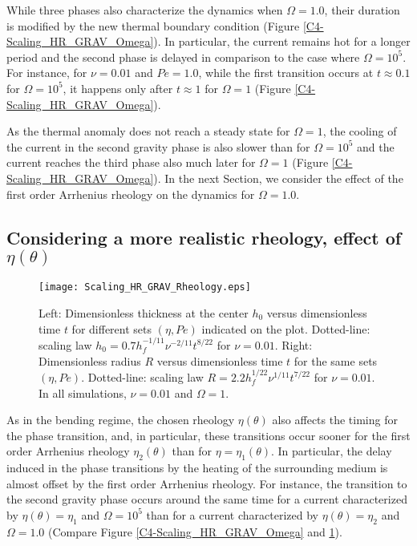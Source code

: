 While three  phases also characterize the  dynamics when $\Omega=1.0$,
their  duration is  modified  by the  new  thermal boundary  condition
(Figure \ref{C4-Scaling_HR_GRAV_Omega}).   In particular,  the current
remains hot  for a longer  period and the  second phase is  delayed in
comparison  to  the case  where  $\Omega  =10^5$.  For  instance,  for
$\nu=0.01$  and  $Pe=1.0$,  while   the  first  transition  occurs  at
$t \approx 0.1$ for $\Omega=10^5$,  it happens only after $t\approx 1$
for $\Omega=1$ (Figure \ref{C4-Scaling_HR_GRAV_Omega}).

As the thermal  anomaly does not reach a steady  state for $\Omega=1$,
the cooling of the current in  the second gravity phase is also slower
than for  $\Omega=10^5$ and the  current reaches the third  phase also
much later for $\Omega=1$ (Figure \ref{C4-Scaling_HR_GRAV_Omega}).  In
the next Section,  we consider the effect of the  first order Arrhenius
rheology on the dynamics for $\Omega=1.0$.

\subsection{Considering   a  more   realistic   rheology,  effect   of
  $\eta(\theta)$}
\label{C4-sec:cons-more-real-1}
 
\begin{figure}[h!]
  \begin{center}
    \graphicspath{ {/Users/thorey/Documents/These/Projet/Refroidissement/Skin_Model/Figure/Figure_Heating/} }
    \texttt{[image: Scaling\_HR\_GRAV\_Rheology.eps]}
    \caption{Left: Dimensionless thickness at  the center $h_0$ versus
      dimensionless time $t$ for  different sets $(\eta,Pe)$ indicated
      on      the      plot.        Dotted-line:      scaling      law
      $h_0= 0.7h_f^{-1/11}\nu^{-2/11}t^{8/22}$ for $\nu=0.01$.  Right:
      Dimensionless radius  $R$ versus dimensionless time  $t$ for the
      same    sets    $(\eta,Pe)$.      Dotted-line:    scaling    law
      $R=  2.2h_f^{1/22}\nu^{1/11}t^{7/22}$ for  $\nu  =0.01$. In  all
      simulations, $\nu=0.01$ and $\Omega=1$.}
    \label{C4-HR_GRAV_Rheology}
  \end{center}
\end{figure}

As  in the  bending regime,  the chosen  rheology $\eta(\theta)$  also
affects the timing for the phase transition, and, in particular, these
transitions  occur  sooner  for  the first  order  Arrhenius  rheology
$\eta_2(\theta)$ than  for $\eta=\eta_1(\theta)$.  In  particular, the
delay  induced  in  the  phase  transitions  by  the  heating  of  the
surrounding  medium is  almost  offset by  the  first order  Arrhenius
rheology.  For  instance, the transition  to the second  gravity phase
occurs  around   the  same  time   for  a  current   characterized  by
$\eta(\theta)   =\eta_1$   and   $\Omega=10^5$  than   for   a   current
characterized  by  $\eta(\theta)  =\eta_2$ and  $\Omega=1.0$  (Compare
Figure \ref{C4-Scaling_HR_GRAV_Omega} and \ref{C4-HR_GRAV_Rheology}).

